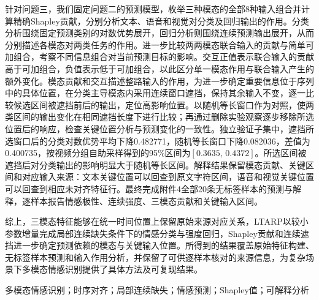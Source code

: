 针对问题三，我们固定问题二的预测模型，枚举三种模态的全部8种输入组合并计算精确Shapley贡献，分别分析文本、语音和视觉对分类及回归输出的作用。分类分析围绕固定预测类别的对数优势展开，回归分析则围绕连续预测输出展开，从而分别描述各模态对两类任务的作用。进一步比较两两模态联合输入的贡献与简单可加组合，考察不同信息组合对当前预测目标的影响。交互正值表示联合输入的贡献高于可加组合，负值表示低于可加组合，以此区分单一模态作用与联合输入产生的额外变化。模态贡献和交互描述整路输入的作用，为进一步确定重要信息位于序列中的具体位置，在分类主导模态内采用连续窗口遮挡，保持其余输入不变，逐一比较候选区间被遮挡前后的输出，定位高影响位置。以随机等长窗口作为对照，使两类区间的输出变化在相同遮挡长度下进行比较；再通过删除实验观察逐步移除所选位置后的响应，检查关键位置分析与预测变化的一致性。独立验证子集中，遮挡所选窗口后的分类对数优势平均下降0.482771，随机等长窗口下降0.082036，差值为0.400735，按视频分组自助采样得到的95\%区间为$[0.3635,\,0.4372]$。所选区间被遮挡后对分类输出的影响明显大于随机等长区间。解释结果保留模态贡献、关键区间和对应输入来源：文本关键位置可以回查到原文字符区间，语音和视觉关键位置可以回查到相应未对齐特征行。最终完成附件4全部20条无标签样本的预测与解释，逐样本报告情感极性、连续强度、三模态贡献和关键输入区间。

综上，三模态特征能够在统一时间位置上保留原始来源对应关系，LTARP以较小参数增量完成局部连续缺失条件下的情感分类与强度回归，Shapley贡献和连续遮挡进一步确定预测依赖的模态与关键输入位置。所得到的结果覆盖原始特征构建、无标签样本预测和输入作用分析，并保留了可供逐样本核对的来源信息，为复杂场景下多模态情感识别提供了具体方法及可复现结果。

\par\vspace{0.7\baselineskip}
多模态情感识别；时序对齐；局部连续缺失；情感预测；Shapley值；可解释分析
